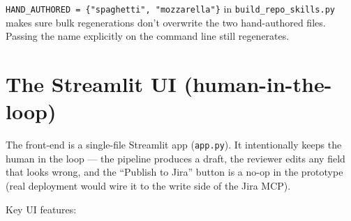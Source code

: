\documentclass[11pt,a4paper]{article}
\begin{document}
\texttt{HAND\_AUTHORED = \{"spaghetti", "mozzarella"\}} in
\texttt{build\_repo\_skills.py} makes sure bulk regenerations don't
overwrite the two hand-authored files. Passing the name explicitly on the
command line still regenerates.

\newpage

\section{The Streamlit UI (human-in-the-loop)}

The front-end is a single-file Streamlit app (\texttt{app.py}). It intentionally
keeps the human in the loop --- the pipeline produces a draft, the reviewer
edits any field that looks wrong, and the ``Publish to Jira'' button is a
no-op in the prototype (real deployment would wire it to the write side of
the Jira MCP).

Key UI features:
\end{document}
